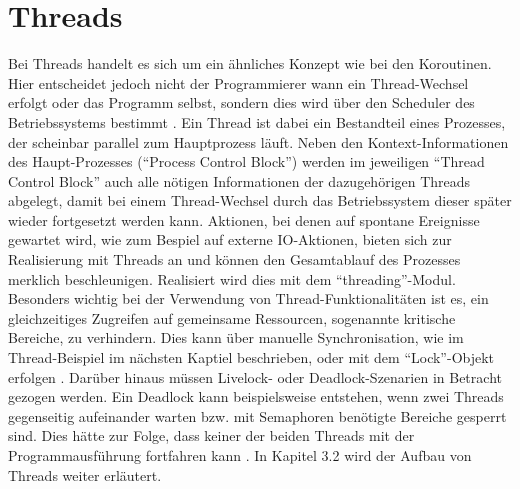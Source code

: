 \section{Threads}
Bei Threads handelt es sich um ein ähnliches Konzept wie bei den Koroutinen. Hier entscheidet jedoch nicht der Programmierer wann ein Thread-Wechsel erfolgt oder das Programm selbst, sondern dies wird über den Scheduler des Betriebssystems bestimmt \cite{AtulKumar.2021}. Ein Thread ist dabei ein Bestandteil eines Prozesses, der scheinbar parallel zum Hauptprozess läuft. Neben den Kontext-Informationen des Haupt-Prozesses (``Process Control Block'') werden im jeweiligen ``Thread Control Block'' auch alle nötigen Informationen der dazugehörigen Threads abgelegt, damit bei einem Thread-Wechsel durch das Betriebssystem dieser später wieder fortgesetzt werden kann\cite[S. 83]{Silberschatz.2003}. Aktionen, bei denen auf spontane Ereignisse gewartet wird, wie zum Bespiel auf externe IO-Aktionen, bieten sich zur Realisierung mit Threads an und können den Gesamtablauf des Prozesses merklich beschleunigen.
Realisiert wird dies mit dem ``threading''-Modul. Besonders wichtig bei der Verwendung von Thread-Funktionalitäten ist es, ein gleichzeitiges Zugreifen auf gemeinsame Ressourcen, sogenannte kritische Bereiche, zu verhindern. Dies kann über manuelle Synchronisation, wie im Thread-Beispiel im nächsten Kaptiel beschrieben, oder mit dem ``Lock''-Objekt erfolgen \cite{PythonSoftwareFoundation.}. Darüber hinaus müssen Livelock- oder Deadlock-Szenarien in Betracht gezogen werden. Ein Deadlock kann beispielsweise entstehen, wenn zwei Threads gegenseitig aufeinander warten bzw. mit Semaphoren benötigte Bereiche gesperrt sind. Dies hätte zur Folge, dass keiner der beiden Threads mit der Programmausführung fortfahren kann \cite[Kap. 32.5.3]{Ernesti.2018}. In Kapitel 3.2 wird der Aufbau von Threads weiter erläutert.

